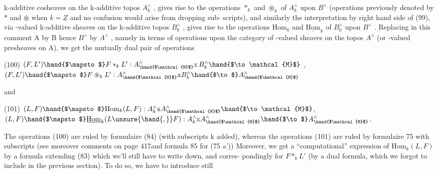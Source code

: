 
k\unsure{\deleted{\^{}}}-additive cosheaves on the k-additive topos $A^{\wedge}_{k}$ , gives rise to the
operations $*_{k}$ and $\circledast_{k}$ of $A^{\wedge}_{k}$ upon $B^{\wedge}$ (operations previously denoted
by $*$ and $\circledast$ when $k=\underline{Z}$ and no confusion would arise from dropping sub-%
scripts), and similarly the interpretation by right hand side of (99),
via -valued  k-additive sheaves on the k-additive topos $B^{\wedge}_{k}$ ,
gives rise to the operations $\mathrm{Hom}_{k}$ and $\underline{\mathrm{Hom}}_{k}$ of $B^{\wedge}_{k}$ upon $B^{\wedge}$ . Replacing
in this comment A by B hence $B^{\wedge}$ by $A^{\wedge}$ , namely in terms of operations upon
the category of -valued sheaves on the topos $A^{\wedge}$ (or -valued presheaves
on A), we get the mutually dual pair of operations


(100) \quad $(F,L')\hand{$\mapsto$} F*_{k}L' : A^{\wedge}_{\hand{$\mathcal{M}$}}\mathrm{x}\, B^{\wedge}_{k}\hand{$\to\mathcal{M}$}$ \quad , \quad $(F,L')\hand{$\mapsto$} F\circledast_{k}L' : A^{\wedge}_{\hand{$\mathcal{M}$}}\mathrm{x}B^{\wedge}_{k}\hand{$\to$} A^{\wedge}_{\hand{$\mathcal{M}$}}$

and

(101) \quad $(L,F)\hand{$\mapsto$}\mathrm{Hom}_{k}(L,F) : A^{\wedge}_{k}\mathrm{x}A^{\wedge}_{\hand{$\mathcal{M}$}}\hand{$\to\mathcal{M}$}$, \quad $(L,F)\hand{$\mapsto$}\underline{\mathrm{Hom}}_{k}(L\unsure{\hand{,}}F) : A^{\wedge}_{k}\mathrm{x}A^{\wedge}_{\hand{$\mathcal{M}$}}\hand{$\to$}A^{\wedge}_{\hand{$\mathcal{M}$}}$.

The operations (100) are ruled by formulaire (84) (with subscripts k
added), whereas the operations (101) are ruled by formulaire 75 with
subscripts (see moreover  comments on page 417\hand{,}and formula 85 for (75 a'))\unsure{\hand{,}}
 Moreover, we get a ``computational'' expression of $\mathrm{Hom}_{k}(L,F)$ by 
a formula extending (83) which we'll still have to write down, and corres-%
pondingly for $F *_{k}L'$ (by a dual formula, which we forgot to include in
the previous section). To do so, we have to introduce still

